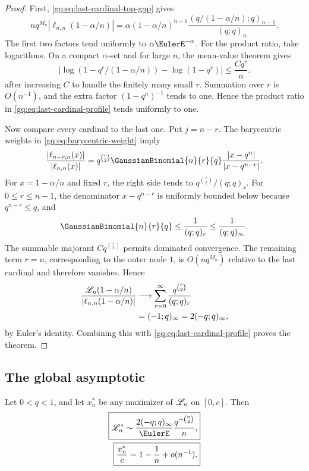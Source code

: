 \begin{proof}
First, \eqref{gq:eq:last-cardinal-top-gap} gives
\begin{equation}
 n q^{M_n}|\ell_{n,n}(1-\alpha/n)|
 =\alpha(1-\alpha/n)^{n-1}
   \frac{(q/(1-\alpha/n);q)_{n-1}}{(q;q)_n}.
 \label{gq:eq:last-cardinal-profile}
\end{equation}
The first two factors tend uniformly to $\alpha\EulerE^{-\alpha}$.  For the
product ratio, take logarithms.  On a compact $\alpha$-set and for large
$n$, the mean-value theorem gives
\[
 \left|\log(1-q^r/(1-\alpha/n))-\log(1-q^r)\right|
 \le \frac{Cq^r}{n}.
\]
after increasing $C$ to handle the finitely many small $r$.  Summation over
$r$ is $O(n^{-1})$, and the extra factor $(1-q^n)^{-1}$ tends to one.  Hence
the product ratio in \eqref{gq:eq:last-cardinal-profile} tends uniformly to one.

Now compare every cardinal to the last one.  Put $j=n-r$.  The barycentric
weights in \eqref{gq:eq:barycentric-weight} imply
\begin{equation}
 \frac{|\ell_{n-r,n}(x)|}{|\ell_{n,n}(x)|}
 =q^{\binom r2}\GaussianBinomial{n}{r}{q}
  \frac{|x-q^n|}{|x-q^{n-r}|}.
 \label{gq:eq:cardinal-ratio}
\end{equation}
For $x=1-\alpha/n$ and fixed $r$, the right side tends to
$q^{\binom r2}/(q;q)_r$.  For $0\le r\le n-1$, the denominator
$x-q^{n-r}$ is uniformly bounded below because $q^{n-r}\le q$, and
\[
 \GaussianBinomial{n}{r}{q}\le\frac1{(q;q)_r}\le\frac1{(q;q)_\infty}.
\]
The summable majorant $Cq^{\binom r2}$ permits dominated convergence.  The
remaining term $r=n$, corresponding to the outer node $1$, is
$O(nq^{M_n})$ relative to the last cardinal and therefore vanishes.  Hence
\begin{align*}
 \frac{\mathscr L_n(1-\alpha/n)}{|\ell_{n,n}(1-\alpha/n)|}
 &\longrightarrow\sum_{r=0}^\infty
   \frac{q^{\binom r2}}{(q;q)_r}\\
 &=(-1;q)_\infty=2(-q;q)_\infty,
\end{align*}
by Euler's identity.  Combining this with
\eqref{gq:eq:last-cardinal-profile} proves the theorem.
\end{proof}

\subsection{The global asymptotic}

\begin{theorem}
\label{gq:thm:global-lebesgue}
Let $0<q<1$, and let $x_n^*$ be any maximizer of $\mathscr L_n$ on $[0,c]$.
Then
\begin{align}
 \boxed{
 \Leb_n^*
 \sim \frac{2(-q;q)_\infty}{\EulerE}
       \frac{q^{-\binom n2}}{n},}
 \label{gq:eq:global-lebesgue-asymptotic}\\
 \boxed{
 \frac{x_n^*}{c}=1-\frac1n+o(n^{-1}).}
 \label{gq:eq:global-lebesgue-location}
\end{align}
\end{theorem}

